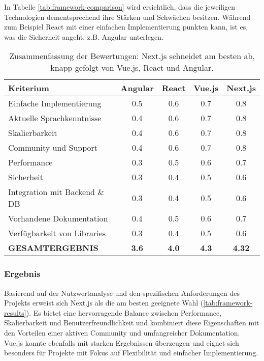 In Tabelle \ref{tab:framework-comparison} wird ersichtlich, dass die jeweiligen Technologien dementsprechend ihre Stärken und Schwächen besitzen. Während zum Beispiel React mit einer einfachen Implementierung punkten kann, ist es, was die Sicherheit angeht, z.B. Angular unterlegen.

\begin{table}[H]
	\centering
	\renewcommand{\arraystretch}{1.2}
	\begin{tabular}{|l|c|c|c|c|}
		\hline
		\rowcolor[HTML]{B6D7A8} \textbf{Kriterium} & \textbf{Angular} & \textbf{React} & \textbf{Vue.js} & \textbf{Next.js} \\
		\hline
		Einfache Implementierung & 0.5 & 0.6 & 0.7 & 0.8 \\
		\hline
		Aktuelle Sprachkenntnisse & 0.4 & 0.6 & 0.7 & 0.8 \\
		\hline
		Skalierbarkeit & 0.4 & 0.6 & 0.7 & 0.8 \\
		\hline
		Community und Support & 0.4 & 0.6 & 0.7 & 0.8 \\
		\hline
		Performance & 0.3 & 0.5 & 0.6 & 0.7 \\
		\hline
		Sicherheit & 0.3 & 0.4 & 0.5 & 0.6 \\
		\hline
		Integration mit Backend \& DB & 0.3 & 0.4 & 0.5 & 0.6 \\
		\hline
		Vorhandene Dokumentation & 0.4 & 0.5 & 0.6 & 0.7 \\
		\hline
		Verfügbarkeit von Libraries & 0.3 & 0.4 & 0.5 & 0.6 \\
		\hline
		\textbf{GESAMTERGEBNIS} & \textbf{3.6} & \textbf{4.0} & \textbf{4.3} & \textbf{4.32} \\
		\hline
	\end{tabular}
	\caption{Zusammenfassung der Bewertungen: Next.js schneidet am besten ab, knapp gefolgt von Vue.js, React und Angular.}
\end{table}

\subsubsection{Ergebnis}

Basierend auf der Nutzwertanalyse und den spezifischen Anforderungen des Projekts erweist sich
Next.js als die am besten geeignete Wahl (\ref{tab:framework-results}). Es bietet eine hervorragende Balance zwischen Performance, Skalierbarkeit und Benutzerfreundlichkeit und kombiniert diese Eigenschaften mit den Vorteilen einer aktiven Community und umfangreicher Dokumentation. Vue.js konnte ebenfalls mit starken Ergebnissen überzeugen und eignet sich besonders für Projekte mit Fokus auf Flexibilität und einfacher Implementierung.

